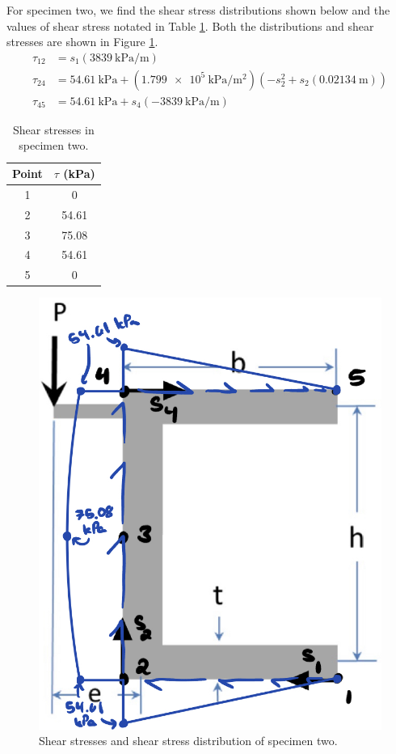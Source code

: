 \documentclass[12 pt]{report}
\begin{document}
For specimen two, we find the shear stress distributions shown below and the values of shear stress notated in Table \ref{tbl:shear_stresses_2}. Both the distributions and shear stresses are shown in Figure \ref{fig:shear_stresses_2}.
\begin{align*}
	\tau_{12}&=s_1(\qty{3839}{\kilo\pascal\per\meter})\\
	\tau_{24}&=\qty{54.61}{\kilo\pascal}+(\qty{1.799e5}{\kilo\pascal\per\meter\squared})(-s_2^2+s_2(\qty{0.02134}{\meter}))\\
	\tau_{45}&=\qty{54.61}{\kilo\pascal}+s_4(\qty{-3839}{\kilo\pascal\per\meter})
\end{align*}

\begin{table}[!htbp]
\caption{Shear stresses in specimen two.}
\begin{center}
	\begin{tabular}{|c|c|}
		\hline
		Point&$\tau$ (\unit{\kilo\pascal})\\
		\hline
		\num{1}&\num{0}\\
		\hline
		\num{2}&\num{54.61}\\
		\hline
		\num{3}&\num{75.08}\\
		\hline
		\num{4}&\num{54.61}\\
		\hline
		\num{5}&\num{0}\\
		\hline
	\end{tabular}
\end{center}
\label{tbl:shear_stresses_2}
\end{table}

\begin{figure}[htbp]
	\centering
	\includegraphics[width=5in]{images/shear_stresses_2}
	\caption{Shear stresses and shear stress distribution of specimen two.}
	\label{fig:shear_stresses_2}
\end{figure}
\end{document}
